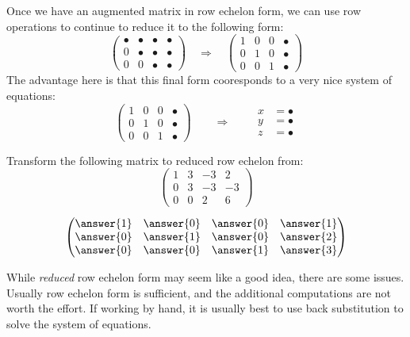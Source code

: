 \documentclass{ximera}
\begin{document}
Once we have an augmented matrix in row echelon form, we can use row
operations to continue to reduce it to the following form:
\[
\begin{pmatrix}
  \bullet & \bullet & \bullet & \bullet \\
     0   & \bullet & \bullet & \bullet \\
     0  &    0 & \bullet & \bullet 
\end{pmatrix}
\quad
\Rightarrow
\quad
\begin{pmatrix}
  1 & 0 & 0  & \bullet \\
     0   & 1  &  0 & \bullet \\
     0  &    0 & 1 & \bullet 
\end{pmatrix}
\]
The advantage here is that this final form cooresponds to a very nice system of equations:
\[
\left(\begin{array}{ccc|c}
  1 &   0 & 0 & \bullet  \\
  0 &   1 & 0 & \bullet \\
   0& 0  &  1 & \bullet
\end{array}\right)
\qquad\Longrightarrow\qquad
\begin{aligned}
      x &= \bullet  \\
      y &= \bullet  \\
      z &=\bullet 
\end{aligned}
\]
\begin{question}
  Transform the following matrix to reduced row echelon from:
  \[
  \begin{pmatrix}
  1 & 3 & -3 & 2  \\
  0 & 3 & -3 & -3 \\
  0 & 0 &  2 & 6
  \end{pmatrix}
  \]
  \begin{prompt}
    \[
    \begin{pmatrix}
      \answer{1} & \answer{0} & \answer{0} & \answer{1} \\
      \answer{0} & \answer{1} & \answer{0} & \answer{2} \\
      \answer{0} & \answer{0} & \answer{1} & \answer{3} 
    \end{pmatrix}
    \]
  \end{prompt}
\end{question}
While \textit{reduced} row echelon form may seem like a good idea,
there are some issues.  Usually row echelon form is sufficient, and
the additional computations are not worth the effort.  If working by
hand, it is usually best to use back substitution to solve the system of equations.
\end{document}
